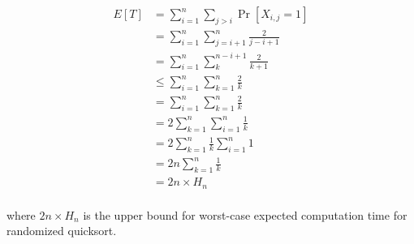         \[
            \begin{aligned}
                E[T] & = \sum_{i = 1}^{n} \sum_{j > i} \Pr[X_{i, j} = 1]\\
                & = \sum_{i = 1}^{n} \sum_{j = i + 1}^{n} \frac{2}{j - i + 1}\\
                & = \sum_{i = 1}^{n} \sum_{k}^{n - i + 1} \frac{2}{k + 1}\\
                & \leq \sum_{i = 1}^{n} \sum_{k = 1}^{n} \frac{2}{k}\\
                & = \sum_{i = 1}^{n} \sum_{k = 1}^{n} \frac{2}{k}\\
                & = 2 \sum_{k = 1}^{n} \sum_{i = 1}^{n} \frac{1}{k}\\
                & = 2 \sum_{k = 1}^{n} \frac{1}{k} \sum_{i = 1}^{n} 1\\
                & = 2n \sum_{k = 1}^{n} \frac{1}{k}\\
                & = 2n \times H_n\\
            \end{aligned}
        \]

        where \(2n \times H_n\) is the upper bound for worst-case expected computation time for randomized quicksort.